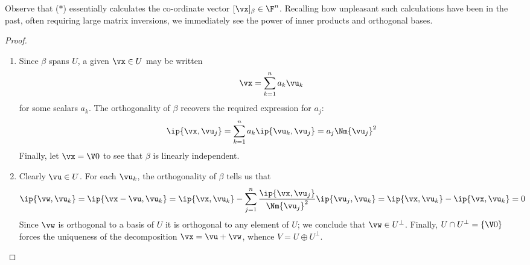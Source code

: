 Observe that ($\ast$) essentially calculates the co-ordinate vector $[\vx]_\beta\in\F^n$. Recalling how unpleasant such calculations have been in the past, often requiring large matrix inversions, we immediately see the power of inner products and orthogonal bases. 
\goodbreak
 

\begin{proof}
\begin{enumerate}
  \item Since $\beta$ spans $U$, a given $\vx\in U$ may be written
  \[\vx=\sum_{k=1}^na_k\vu_k\]
  for some scalars $a_k$. The orthogonality of $\beta$ recovers the required expression for $a_j$:
  \[\ip{\vx,\vu_j}=\sum_{k=1}^na_k\ip{\vu_k,\vu_j}=a_j\Nm{\vu_j}^2\]
 	Finally, let $\vx=\V0$ to see that $\beta$ is linearly independent.
  \item Clearly $\vu\in U$. For each $\vu_k$, the orthogonality of $\beta$ tells us that
  \[\ip{\vw,\vu_k}=\ip{\vx-\vu,\vu_k}=\ip{\vx,\vu_k}-\sum_{j=1}^n\frac{\ip{\vx,\vu_j}}{\Nm{\vu_j}^2}\ip{\vu_j,\vu_k}=\ip{\vx,\vu_k}-\ip{\vx,\vu_k}=0\]
  Since $\vw$ is orthogonal to a basis of $U$ it is orthogonal to any element of $U$; we conclude that $\vw\in U^\perp$. Finally, $U\cap U^\perp=\{\V0\}$ forces the uniqueness of the decomposition $\vx=\vu+\vw$, whence $V=U\oplus U^\perp$.\qedhere
\end{enumerate}
\end{proof}


